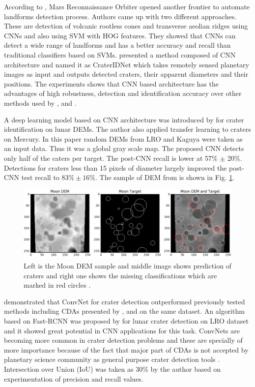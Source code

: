 \documentclass[11pt]{article}
\begin{document}
According to \cite{palafox2017automated}, Mars Reconnaissance Orbiter opened another frontier to automate landforms detection process. Authors came up with two different approaches. These are detection of volcanic rootless cones and transverse aeolian ridges using CNNs and also using SVM with HOG features. They showed that CNNs can detect a wide range of landforms and has a better accuracy and recall than traditional classifiers based on SVMs. \cite{wang2018crateridnet} presented a method composed of CNN architecture and named it as CraterIDNet which takes remotely sensed planetary images as input and outputs detected craters, their apparent diameters and their positions. The experiments shows that CNN based architecture has the advantages of high robustness, detection and identification accuracy over other methods used by \cite{urbach2009automatic}, \cite{bandeira2010automatic} and \cite{ding2011subkilometer}.

A deep learning model based on CNN architecture was introduced by \cite{silburt2019lunar} for crater identification on lunar DEMs. The author also applied transfer learning to craters on Mercury. In this paper random DEMs from LRO and Kaguya were taken as an input data. Thus it was a global gray scale map. The proposed CNN detects only half of the caters per target. The post-CNN recall is lower at 57\% $\pm$ 20\%. Detections for craters less than 15 pixels of diameter largely improved the post-CNN test recall to $83 \% \pm 16 \%$. The sample of DEM from \cite{silburt2019lunar} is shown in Fig. \ref{dem_}.

\begin{figure}[ht!]
	\centering
	\includegraphics[width=.8\linewidth]{files/unet/dem.png}
	\caption{Left is the Moon DEM sample and middle image shows prediction of craters and right one shows the missing classifications which are marked in red circles \cite{silburt2019lunar}.}
	\label{dem_}
\end{figure}

\cite{cohen2016crater} demonstrated that ConvNet for crater detection outperformed previously tested methods including CDAs presented by \cite{stepinski2009machine}, \cite{bandeira2010automatic} and \cite{ding2011subkilometer} on the same dataset. An algorithm based on Fast-RCNN was proposed by \cite{emami2015automatic} for lunar crater detection on LRO dataset and it showed great potential in CNN applications for this task. ConvNets are becoming more common in crater detection problems and these are specially of more importance because of the fact that major part of CDAs is not accepted by planetary science community as general purpose crater detection tools \cite{emami2015automatic}. Intersection over Union (IoU) was taken as 30\% by the author based on experimentation of precision and recall values.
\end{document}
